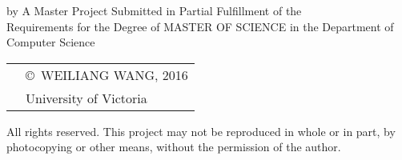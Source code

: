 \pagebreak
{
\centering
\thesistitle
\tpbreak
by
\tpbreak
\nameanddegrees
\tpbreak
A Master Project Submitted in Partial Fulfillment of the \\
Requirements for the Degree of
\tpbreak
MASTER OF SCIENCE
\tpbreak
in the Department of Computer Science\\
\vfill
\begin{tabular}{cl}
& \copyright\ WEILIANG WANG, 2016\\
& \phantom{\copyright} University of Victoria
\end{tabular}
\tpbreak
All rights reserved. This project may not be reproduced in whole or in part, by \\
\hfill photocopying or other means, without the permission of the author. 
\hfill
}
\pagebreak
